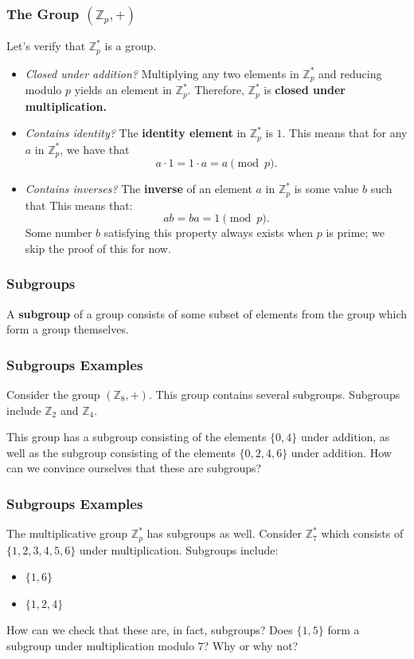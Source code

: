\documentclass{beamer}
\newcommand{\<}{\langle}
\renewcommand{\>}{\rangle}
\newcommand{\Z}{\mathbb{Z}}
\begin{document}
\begin{frame}
\frametitle{The Group $(\mathbb{Z}_p, +)$}

Let's verify that $\Z_p^*$ is a group.
\begin{itemize}
\item \emph{Closed under addition?} Multiplying any two elements in $\Z_p^*$ and reducing modulo $p$ yields an element in $\Z_p^*$. Therefore, $\Z_p^*$ is \textbf{closed under multiplication.}
\item \emph{Contains identity?} The \textbf{identity element} in $\Z_p^*$ is $1$. This means that for any $a$ in $\Z_p^*$, we have that 
\[a\cdot 1 = 1\cdot a = a\pmod p.\]
\item {\emph{Contains inverses?}} The \textbf{inverse} of an element $a$ in $\Z_p^*$ is some value $b$ such that This means that:
\[
ab = ba = 1 \pmod p.
\]
Some number $b$ satisfying this property always exists when $p$ is prime; we skip the proof of this for now.
\end{itemize}
\end{frame}


\begin{frame}
\frametitle{Subgroups}

A \textbf{subgroup} of a group consists of some subset of elements from the group which form a group themselves.
\end{frame}

\begin{frame}
\frametitle{Subgroups Examples}

Consider the group $(\Z_8, +)$. This group contains several subgroups. Subgroups include $\Z_2$ and $\Z_4$. \newline

This group has a subgroup consisting of the elements $\{0, 4\}$ under addition, as well as the subgroup consisting of the elements $\{0, 2, 4, 6\}$ under addition. How can we convince ourselves that these are subgroups?
\end{frame}

\begin{frame}
\frametitle{Subgroups Examples}

The multiplicative group $\Z_p^*$ has subgroups as well. Consider $\Z_7^*$ which consists of $\{1, 2, 3, 4, 5, 6\}$ under multiplication. Subgroups include:
\begin{itemize}
\item $\{1,6\}$ 
\item $\{1, 2, 4\}$
\end{itemize}
How can we check that these are, in fact, subgroups? Does $\{1, 5\}$ form a subgroup under multiplication modulo $7$? Why or why not?
\end{frame}
\end{document}
